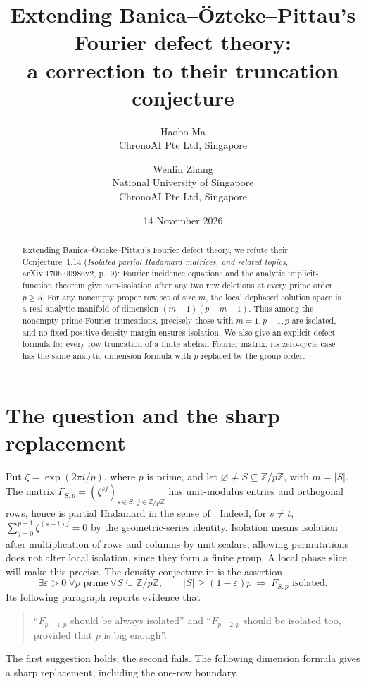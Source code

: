 \documentclass[11pt]{article}
\title{Extending Banica--\"Ozteke--Pittau's Fourier defect theory:\protect\\
a correction to their truncation conjecture}
\author{Haobo Ma\\\small ChronoAI Pte Ltd, Singapore
\and Wenlin Zhang\\\small National University of Singapore\\\small ChronoAI Pte Ltd, Singapore}
\date{14 November 2026}
\newcommand{\Z}{\mathbb Z}
\begin{document}
\maketitle
\begin{abstract}
Extending Banica--\"Ozteke--Pittau's Fourier defect theory, we refute
their Conjecture~1.14
(\emph{Isolated partial Hadamard matrices, and related topics},
arXiv:1706.00986v2, p.~9): Fourier incidence equations and the analytic
implicit-function theorem give non-isolation after any two row deletions
at every prime order $p\geq5$.
For any nonempty proper row set of size $m$, the local
dephased solution space is a real-analytic manifold of dimension
$(m-1)(p-m-1)$. Thus among the nonempty prime Fourier truncations,
precisely those with $m=1,p-1,p$ are isolated, and no fixed positive
density margin ensures isolation.
We also give an explicit defect formula for every row truncation of a
finite abelian Fourier matrix; its zero-cycle case has the same analytic
dimension formula with $p$ replaced by the group order.
\end{abstract}

\section{The question and the sharp replacement}
Put $\zeta=\exp(2\pi i/p)$, where $p$ is prime, and let
$\varnothing\ne S\subseteq\Z/p\Z$, with $m=|S|$.
The matrix $F_{S,p}=(\zeta^{sj})_{s\in S,\,j\in\Z/p\Z}$ has unit-modulus
entries and orthogonal rows, hence is partial Hadamard in the sense of
\cite[Definition 1.1]{BOP}. Indeed, for $s\ne t$,
$\sum_{j=0}^{p-1}\zeta^{(s-t)j}=0$ by the geometric-series identity.
Isolation means isolation after multiplication of rows and columns by
unit scalars; allowing permutations does not alter local isolation,
since they form a finite group. A local phase slice will make this precise.
The density conjecture in \cite[Conjecture 1.14, p.~9]{BOP} is the assertion
\[
\exists\varepsilon>0\ \forall p\text{ prime}\ \forall S\subseteq\Z/p\Z,
\qquad |S|\geq(1-\varepsilon)p\ \Longrightarrow\ F_{S,p}\text{ isolated}.
\]
Its following paragraph reports evidence that
\begin{quote}\small
``$F_{p-1,p}$ should be always isolated'' and
``$F_{p-2,p}$ should be isolated too, provided that $p$ is big enough''.
\end{quote}
The first suggestion holds; the second fails. The following
dimension formula gives a sharp replacement, including the one-row boundary.
\end{document}
